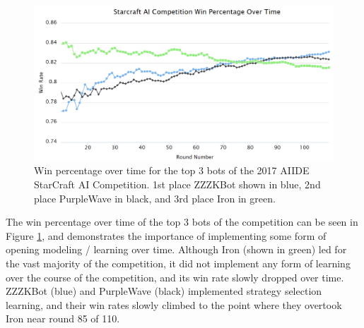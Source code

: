 \begin{figure}[t]
  \centering
  \includegraphics[width=1\columnwidth]{fig/aiideWinPerc.png}
  \caption{Win percentage over time for the top 3 bots of the 2017 AIIDE StarCraft AI Competition. 1st place ZZZKBot shown in blue, 2nd place PurpleWave in black, and 3rd place Iron in green. }
  \label{aiideWinPerc}
\end{figure}

The win percentage over time of the top 3 bots of the competition can be seen in Figure \ref{aiideWinPerc}, and demonstrates the importance of implementing some form of opening modeling / learning over time. Although Iron (shown in green) led for the vast majority of the competition, it did not implement any form of learning over the course of the competition, and its win rate slowly dropped over time. ZZZKBot (blue) and PurpleWave (black) implemented strategy selection learning, and their win rates slowly climbed to the point where they overtook Iron near round 85 of 110. 